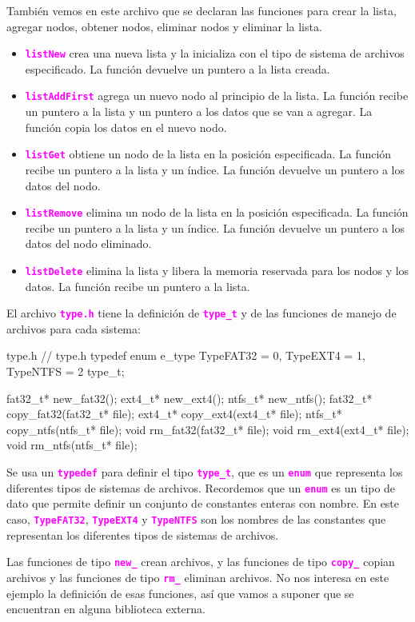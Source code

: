 \documentclass[]{scrartcl}
\newcommand{\hl}[1]{\textcolor{magenta}{\textbf{\texttt{#1}}}}
\begin{document}
También vemos en este archivo que se declaran las funciones para crear la lista, agregar nodos, obtener nodos, eliminar nodos y eliminar la lista.
\begin{itemize}
  \item \hl{listNew} crea una nueva lista y la inicializa con el tipo de sistema de archivos especificado. La función devuelve un puntero a la lista creada.
  \item \hl{listAddFirst} agrega un nuevo nodo al principio de la lista. La función recibe un puntero a la lista y un puntero a los datos que se van a agregar. La función copia los datos en el nuevo nodo.
  \item \hl{listGet} obtiene un nodo de la lista en la posición especificada. La función recibe un puntero a la lista y un índice. La función devuelve un puntero a los datos del nodo.
  \item \hl{listRemove} elimina un nodo de la lista en la posición especificada. La función recibe un puntero a la lista y un índice. La función devuelve un puntero a los datos del nodo eliminado.
  \item \hl{listDelete} elimina la lista y libera la memoria reservada para los nodos y los datos. La función recibe un puntero a la lista.
\end{itemize}

El archivo \hl{type.h} tiene la definición de \hl{type\_t} y de las funciones de manejo de archivos para cada sistema:

\begin{cbox}[]{type.h}
  // type.h
  typedef enum e_type {
    TypeFAT32 = 0,
    TypeEXT4 = 1,
    TypeNTFS = 2
  } type_t;

  fat32_t* new_fat32();
  ext4_t* new_ext4();
  ntfs_t* new_ntfs();          
  fat32_t* copy_fat32(fat32_t* file);
  ext4_t* copy_ext4(ext4_t* file);
  ntfs_t* copy_ntfs(ntfs_t* file);
  void rm_fat32(fat32_t* file);
  void rm_ext4(ext4_t* file);
  void rm_ntfs(ntfs_t* file);
\end{cbox}

Se usa un \hl{typedef} para definir el tipo \hl{type\_t}, que es un \hl{enum} que representa los diferentes tipos de sistemas de archivos. Recordemos que un \hl{enum} es un tipo de dato que permite definir un conjunto de constantes enteras con nombre. En este caso, \hl{TypeFAT32}, \hl{TypeEXT4} y \hl{TypeNTFS} son los nombres de las constantes que representan los diferentes tipos de sistemas de archivos.

Las funciones de tipo \hl{new\_} crean archivos, y las funciones de tipo \hl{copy\_} copian archivos y las funciones de tipo \hl{rm\_} eliminan archivos. No nos interesa en este ejemplo la definición de esas funciones, así que vamos a suponer que se encuentran en alguna biblioteca externa.
\end{document}

